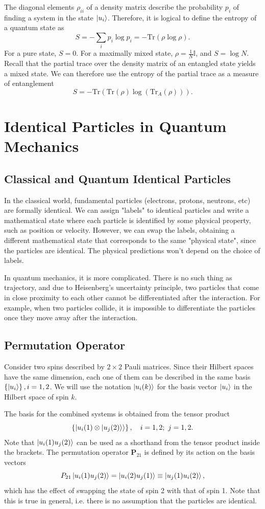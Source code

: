\documentclass{article}
\begin{document}
The diagonal elements $\rho _{i i}$ of a density matrix describe the probability $p_i$ of finding a system in the state $\ket{u_i}$. Therefore, it is logical to define the entropy of a quantum state as 
\[
    S=-\sum_{i}p_i\log p_i=-\text{Tr}(\rho \log\rho ).
\]
For a pure state, $S=0$. For a maximally mixed state, $\rho =\frac{1}{N}\mathbb{I}$, and $S=\log N$. Recall that the partial trace over the density matrix of an entangled state yields a mixed state. We can therefore use the entropy of the partial trace as a measure of entanglement 
\[
    S=-\text{Tr}\left( \text{Tr}(\rho )\log \left( \text{Tr}_A(\rho ) \right) \right).
\]

\section{Identical Particles in Quantum Mechanics}
\subsection{Classical and Quantum Identical Particles}
In the classical world, fundamental particles (electrons, protons, neutrons, etc) are formally identical. We can assign "labels" to identical particles and write a mathematical state where each particle is identified by some physical property, such as position or velocity. However, we can swap the labels, obtaining a different mathematical state that corresponds to the same "physical state", since the particles are identical. The physical predictions won't depend on the choice of labels.

In quantum mechanics, it is more complicated. There is no such thing as trajectory, and due to Heisenberg's uncertainty principle, two particles that come in close proximity to each other cannot be differentiated after the interaction. For example, when two particles collide, it is impossible to differentiate the particles once they move away after the interaction.

\subsection{Permutation Operator}
Consider two spins described by $2\times 2$ Pauli matrices. Since their Hilbert spaces have the same dimension, each one of them can be described in the same basis $\left\{ \ket{u_i} \right\},i=1,2$. We will use the notation $\ket{u_i(k)}$ for the basis vector $\ket{u_i}$ in the Hilbert space of spin $k$.

The basis for the combined systems is obtained from the tensor product 
\[
    \left\{ \ket{u_i(1)\otimes \ket{u_j(2)}} \right\},\quad i=1,2;\ j=1,2.
\]
Note that $\ket{u_i(1)u_j(2)}$ can be used as a shorthand from the tensor product inside the brackets. The permutation operator $\mathbf{P}_{21}$ is defined by its action on the basis vectors 
\[
    P_{21}\ket{u_{i}(1)u_j(2)}=\ket{u_i(2)u_j(1)}\equiv \ket{u_j(1)u_i(2)},
\]
which has the effect of swapping the state of spin 2 with that of spin 1. Note that this is true in general, i.e. there is no assumption that the particles are identical.
\end{document}
